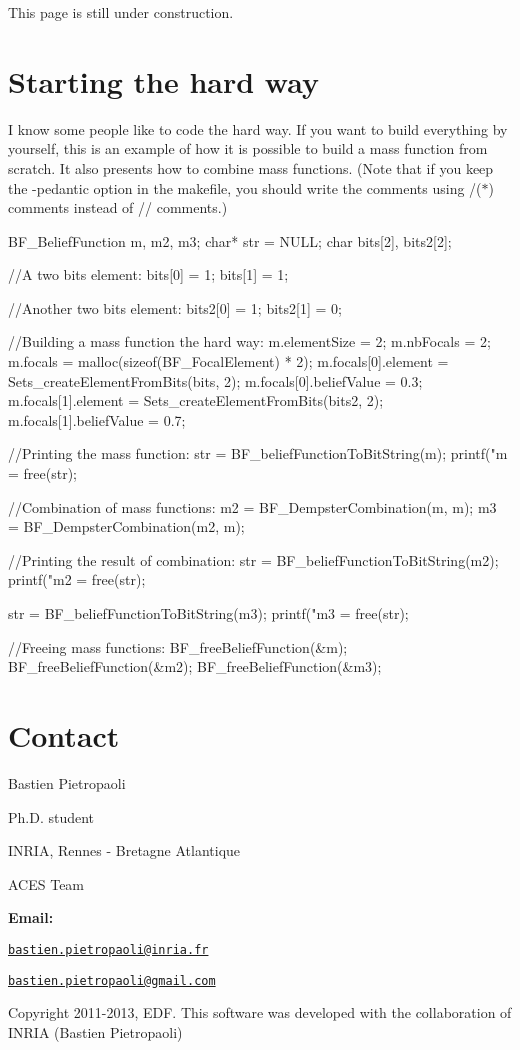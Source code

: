 This page is still under construction.\hypertarget{_tuto_page_ref_hard}{}\section{Starting the hard way}\label{_tuto_page_ref_hard}
I know some people like to code the hard way. If you want to build everything by yourself, this is an example of how it is possible to build a mass function from scratch. It also presents how to combine mass functions. (Note that if you keep the -\/pedantic option in the makefile, you should write the comments using /($\ast$) comments instead of // comments.) 
\begin{DoxyCode}
 BF_BeliefFunction m, m2, m3;
 char* str = NULL;
 char bits[2], bits2[2];

 //A two bits element:
 bits[0] = 1;
 bits[1] = 1;
 
 //Another two bits element: 
 bits2[0] = 1;
 bits2[1] = 0;
 
 //Building a mass function the hard way: 
 m.elementSize = 2;
 m.nbFocals = 2;
 m.focals = malloc(sizeof(BF_FocalElement) * 2);
 m.focals[0].element = Sets_createElementFromBits(bits, 2);
 m.focals[0].beliefValue = 0.3;
 m.focals[1].element = Sets_createElementFromBits(bits2, 2);
 m.focals[1].beliefValue = 0.7;
 
 //Printing the mass function: 
 str = BF_beliefFunctionToBitString(m);
 printf("m = \n%
 free(str);
 
 //Combination of mass functions: 
 m2 = BF_DempsterCombination(m, m);
 m3 = BF_DempsterCombination(m2, m);
 
 //Printing the result of combination: 
 str = BF_beliefFunctionToBitString(m2);
 printf("m2 = \n%
 free(str);
 
 str = BF_beliefFunctionToBitString(m3);
 printf("m3 = \n%
 free(str);
 
 //Freeing mass functions: 
 BF_freeBeliefFunction(&m);
 BF_freeBeliefFunction(&m2);
 BF_freeBeliefFunction(&m3);
\end{DoxyCode}
\hypertarget{_tuto_page_Tuto_contact}{}\section{Contact}\label{_tuto_page_Tuto_contact}
Bastien Pietropaoli \par
 Ph.D. student \par
 INRIA, Rennes -\/ Bretagne Atlantique \par
 ACES Team \par


{\bfseries Email:} \par
 \href{mailto:bastien.pietropaoli@inria.fr}{\tt bastien.pietropaoli@inria.fr} \par
 \href{mailto:bastien.pietropaoli@gmail.com}{\tt bastien.pietropaoli@gmail.com} \par


Copyright 2011-\/2013, EDF. This software was developed with the collaboration of INRIA (Bastien Pietropaoli) 